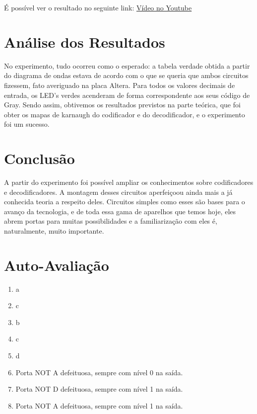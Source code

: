 \documentclass[12pt]{article}
\begin{document}
É possível ver o resultado no seguinte link: \href{https://www.youtube.com/watch?v=paRaiHqDqBo}{Vídeo no Youtube}


\section{Análise dos Resultados}
\label{sec:Resultados}

No experimento, tudo ocorreu como o esperado: a tabela verdade obtida a partir do diagrama de ondas estava de acordo com o que se queria que ambos circuitos fizessem, fato averiguado na placa Altera. Para todos os valores decimais de entrada, os LED’s verdes acenderam de forma correspondente aos seus código de Gray.
Sendo assim, obtivemos os resultados previstos na parte teórica, que foi obter os mapas de karnaugh do codificador e do decodificador, e o experimento foi um sucesso. 

\section{Conclusão}
\label{sec:Conclusao}

A partir do experimento foi possível ampliar os conhecimentos sobre codificadores e decodificadores. A montagem desses circuitos aperfeiçoou ainda mais a já conhecida teoria a respeito deles. Circuitos simples como esses são bases para o avanço da tecnologia, e de toda essa gama de aparelhos que temos hoje, eles abrem portas para muitas possibilidades e a familiarização com eles é, naturalmente, muito importante.






\newpage 
\section*{Auto-Avaliação}

\begin{enumerate}
    \item a
    \item c
    \item b
    \item c
    \item d
    \item Porta NOT A defeituosa, sempre com nível 0 na saída.
    \item Porta NOT D defeituosa, sempre com nível 1 na saída. 
    \item Porta NOT A defeituosa, sempre com nível 1 na saída.
\end{enumerate}
\end{document}
